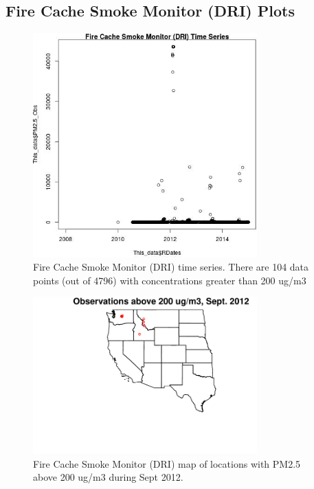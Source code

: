 \subsection{Fire Cache Smoke Monitor (DRI) Plots}
\begin{figure} 
\centering 
\includegraphics[width=0.77\textwidth]{Code_Outputs/FireCacheDRI_time_series.jpg} 
\caption{\label{fig:FireCacheDRITS}Fire Cache Smoke Monitor (DRI) time series. There are 104 data points (out of 4796) with concentrations greater than 200 ug/m3} 
\end{figure} 
 

\begin{figure} 
\centering 
\includegraphics[width=0.77\textwidth]{Code_Outputs/FireCacheDRISep2012High_map.pdf} 
\caption{\label{fig:FireCacheDRIS12}Fire Cache Smoke Monitor (DRI) map of locations with PM2.5 above 200 ug/m3 during Sept 2012.} 
\end{figure} 
 
